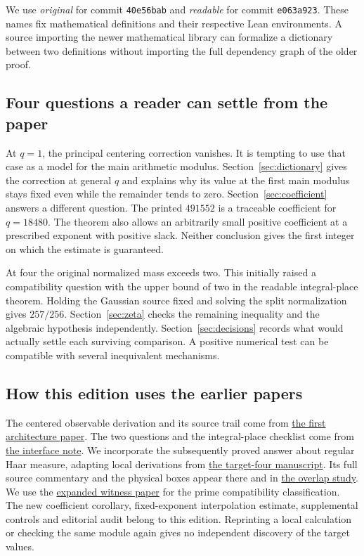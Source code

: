 \documentclass[12pt,letterpaper]{article}
\newcommand{\id}[1]{{\small\nolinkurl{#1}}}
\newcommand{\oldpaper}[2]{\href{https://github.com/nousentllc/riemann-hypothesis/tree/90e46dd4be3b077bfed33fa64280eb9f306c9d87/research/uriel/experiments/#1}{#2}}
\begin{document}
We use \emph{original} for commit \id{40e56bab} and \emph{readable} for commit \id{e063a923}. These names fix mathematical definitions and their respective Lean environments. A source importing the newer mathematical library can formalize a dictionary between two definitions without importing the full dependency graph of the older proof.

\subsection{Four questions a reader can settle from the paper}
At $q=1$, the principal centering correction vanishes. It is tempting to use that case as a model for the main arithmetic modulus. Section~\ref{sec:dictionary} gives the correction at general $q$ and explains why its value at the first main modulus stays fixed even while the remainder tends to zero. Section~\ref{sec:coefficient} answers a different question. The printed $491552$ is a traceable coefficient for $q=18480$. The theorem also allows an arbitrarily small positive coefficient at a prescribed exponent with positive slack. Neither conclusion gives the first integer on which the estimate is guaranteed.

At four the original normalized mass exceeds two. This initially raised a compatibility question with the upper bound of two in the readable integral-place theorem. Holding the Gaussian source fixed and solving the split normalization gives $257/256$. Section~\ref{sec:zeta} checks the remaining inequality and the algebraic hypothesis independently. Section~\ref{sec:decisions} records what would actually settle each surviving comparison. A positive numerical test can be compatible with several inequivalent mechanisms.

\subsection{How this edition uses the earlier papers}
The centered observable derivation and its source trail come from \oldpaper{window-remainder-architecture}{the first architecture paper}. The two questions and the integral-place checklist come from \oldpaper{upstream-interface-comparison}{the interface note}. We incorporate the subsequently proved answer about regular Haar measure, adapting local derivations from \oldpaper{target-four-haar}{the target-four manuscript}. Its full source commentary and the physical boxes appear there and in \oldpaper{target-four-chart-overlap}{the overlap study}. We use the \oldpaper{fixed-datum-host-expanded}{expanded witness paper} for the prime compatibility classification. The new coefficient corollary, fixed-exponent interpolation estimate, supplemental controls and editorial audit belong to this edition. Reprinting a local calculation or checking the same module again gives no independent discovery of the target values.
\end{document}
